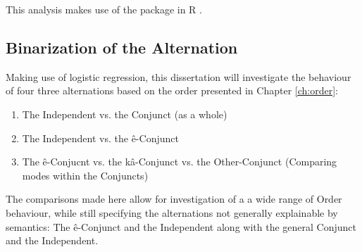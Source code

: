 This analysis makes use of the  package in R \citep{lme4}.


\subsection{Binarization of the Alternation}
Making use of logistic regression, this dissertation will investigate the behaviour of four three alternations based on the order presented in Chapter \ref{ch:order}:
\begin{enumerate}
    \item The Independent vs. the Conjunct (as a whole)
    \item The Independent vs. the ê-Conjunct
    \item The ê-Conjucnt vs. the kâ-Conjunct vs. the Other-Conjunct (Comparing modes within the Conjuncts)

\end{enumerate}

The comparisons made here allow for investigation of a a wide range of Order behaviour, while still specifying the alternations not generally explainable by semantics: The ê-Conjunct and the Independent along with the general Conjunct and the Independent. 

